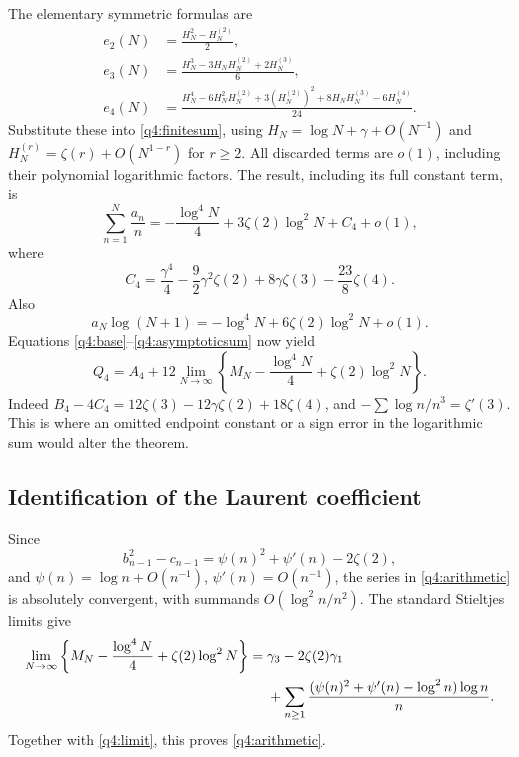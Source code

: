 \documentclass[11pt,a4paper]{article}
\numberwithin{equation}{section}
\theoremstyle{definition}
\theoremstyle{remark}
\begin{document}
The elementary symmetric formulas are
\[
 \begin{split}
 e_2(N)&=\frac{H_N^2-H_N^{(2)}}2,\\
 e_3(N)&=\frac{H_N^3-3H_NH_N^{(2)}+2H_N^{(3)}}6,\\
 e_4(N)&=\frac{H_N^4-6H_N^2H_N^{(2)}+3(H_N^{(2)})^2
                +8H_NH_N^{(3)}-6H_N^{(4)}}{24}.
 \end{split}
\]
Substitute these into \eqref{q4:finitesum}, using
$H_N=\log N+\gamma+O(N^{-1})$ and
$H_N^{(r)}=\zeta(r)+O(N^{1-r})$ for $r\geq2$.
All discarded terms are $o(1)$, including their polynomial logarithmic
factors.  The result, including its full constant term, is
\begin{equation}\label{q4:asymptoticsum}
 \sum_{n=1}^N\frac{a_n}{n}
 =-\frac{\log^4N}{4}+3\zeta(2)\log^2N+C_4+o(1),
\end{equation}
where
\begin{equation}\label{q4:C4}
 C_4=\frac{\gamma^4}{4}-\frac92\gamma^2\zeta(2)
                    +8\gamma\zeta(3)-\frac{23}8\zeta(4).
\end{equation}
Also
\[
 a_N\log(N+1)=-\log^4N+6\zeta(2)\log^2N+o(1).
\]
Equations \eqref{q4:base}--\eqref{q4:asymptoticsum} now yield
\begin{equation}\label{q4:limit}
 Q_4=A_4+12\lim_{N\to\infty}
       \left\{M_N-\frac{\log^4N}{4}+\zeta(2)\log^2N\right\}.
\end{equation}
Indeed $B_4-4C_4=12\zeta(3)-12\gamma\zeta(2)+18\zeta(4)$,
and $-\sum\log n/n^3=\zeta'(3)$.  This is where an omitted endpoint
constant or a sign error in the logarithmic sum would alter the theorem.

\subsection{Identification of the Laurent coefficient}

Since
\[
 b_{n-1}^2-c_{n-1}
   =\psi(n)^2+\psi'(n)-2\zeta(2),
\]
and $\psi(n)=\log n+O(n^{-1})$, $\psi'(n)=O(n^{-1})$, the series
in \eqref{q4:arithmetic} is absolutely convergent, with summands
$O(\log^2n/n^2)$.  The standard Stieltjes limits give
\begin{align}\label{q4:Mconstant}
 \lim_{N\to\infty}
       \left\{M_N-\frac{\log^4N}{4}+\zeta(2)\log^2N\right\}
  ={}&\gamma_3-2\zeta(2)\gamma_1\notag\\
 &+\sum_{n\geq1}
       \frac{(\psi(n)^2+\psi'(n)-\log^2n)\log n}{n}.
\end{align}
Together with \eqref{q4:limit}, this proves \eqref{q4:arithmetic}.
\end{document}
